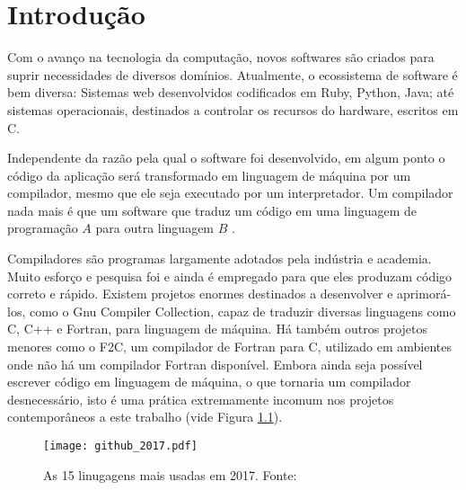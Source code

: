 \chapter{Introdução}
\label{cap:introducao}

Com o avanço na tecnologia da computação, novos softwares são criados para
suprir necessidades de diversos domínios. Atualmente, o ecossistema de software
é bem diversa: Sistemas web desenvolvidos codificados em Ruby, Python, Java; até
sistemas operacionais, destinados a controlar os recursos do hardware, escritos
em C.

Independente da razão pela qual o software foi desenvolvido, em algum ponto o
código da aplicação será transformado em linguagem de máquina por um
compilador, mesmo que ele seja executado por um interpretador. Um compilador
nada mais é que um software que traduz um código em uma linguagem de
programação $A$ para outra linguagem $B$ \citep{dragonbook}.

Compiladores são programas largamente adotados pela indústria e academia. Muito
esforço e pesquisa foi e ainda é empregado para que eles produzam código
correto e rápido. Existem projetos enormes destinados a desenvolver e
aprimorá-los, como o Gnu Compiler Collection, capaz de traduzir diversas
linguagens como C, C++ e Fortran, para linguagem de máquina. Há também outros
projetos menores como o F2C, um compilador de Fortran para C, utilizado em
ambientes onde não há um compilador Fortran disponível.  Embora ainda seja
possível escrever código em linguagem de máquina, o que tornaria um compilador
desnecessário, isto é uma prática extremamente incomum nos projetos
contemporâneos a este trabalho
\citep{githuboctoverse} (vide Figura \ref{fig:github_2017}).

\begin{figure}[ht]
 \centering
 \texttt{[image: github\_2017.pdf]}
 \caption{As 15 linugagens mais usadas em 2017. Fonte: \cite{githuboctoverse}}
 \label{fig:github_2017}
\end{figure}

